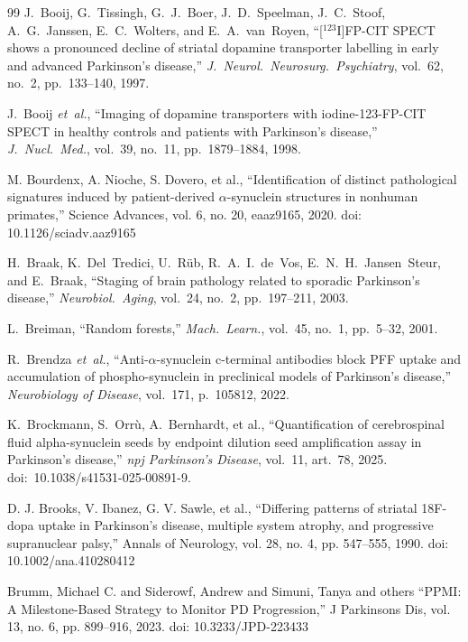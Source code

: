 \begin{thebibliography}{99}
J.~Booij, G.~Tissingh, G.~J.~Boer, J.~D.~Speelman, J.~C.~Stoof, A.~G.~Janssen, E.~C.~Wolters, and E.~A.~van~Royen, ``[$^{123}$I]FP-CIT SPECT shows a pronounced decline of striatal dopamine transporter labelling in early and advanced Parkinson's disease,'' \textit{J.\ Neurol.\ Neurosurg.\ Psychiatry}, vol.~62, no.~2, pp.~133--140, 1997.

J.~Booij \textit{et~al.}, ``Imaging of dopamine transporters with iodine-123-FP-CIT SPECT in healthy controls and patients with Parkinson's disease,'' \textit{J.\ Nucl.\ Med.}, vol.~39, no.~11, pp.~1879--1884, 1998.

 M. Bourdenx, A. Nioche, S. Dovero, et al., ``Identification of distinct pathological signatures induced by patient-derived $\alpha$-synuclein structures in nonhuman primates,'' Science Advances, vol. 6, no. 20, eaaz9165, 2020. doi: 10.1126/sciadv.aaz9165

H.~Braak, K.~Del~Tredici, U.~R{\"u}b, R.~A.~I.~de~Vos, E.~N.~H.~Jansen~Steur, and E.~Braak, ``Staging of brain pathology related to sporadic Parkinson's disease,'' \textit{Neurobiol.\ Aging}, vol.~24, no.~2, pp.~197--211, 2003.

L.~Breiman, ``Random forests,'' \textit{Mach.\ Learn.}, vol.~45, no.~1, pp.~5--32, 2001.

R.~Brendza \textit{et~al.}, ``Anti-$\alpha$-synuclein c-terminal antibodies block PFF uptake and accumulation of phospho-synuclein in preclinical models of Parkinson's disease,'' \textit{Neurobiology of Disease}, vol.~171, p.~105812, 2022.

K.~Brockmann, S.~Orrù, A.~Bernhardt, et al., ``Quantification of cerebrospinal fluid alpha-synuclein seeds by endpoint dilution seed amplification assay in Parkinson's disease,'' \textit{npj Parkinson's Disease}, vol.~11, art.~78, 2025. doi:~10.1038/s41531-025-00891-9.

 D. J. Brooks, V. Ibanez, G. V. Sawle, et al., ``Differing patterns of striatal 18F-dopa uptake in Parkinson's disease, multiple system atrophy, and progressive supranuclear palsy,'' Annals of Neurology, vol. 28, no. 4, pp. 547--555, 1990. doi: 10.1002/ana.410280412

 Brumm, Michael C. and Siderowf, Andrew and Simuni, Tanya and others ``PPMI: A Milestone-Based Strategy to Monitor PD Progression,'' J Parkinsons Dis, vol. 13, no. 6, pp. 899--916, 2023. doi: 10.3233/JPD-223433


\end{thebibliography}
